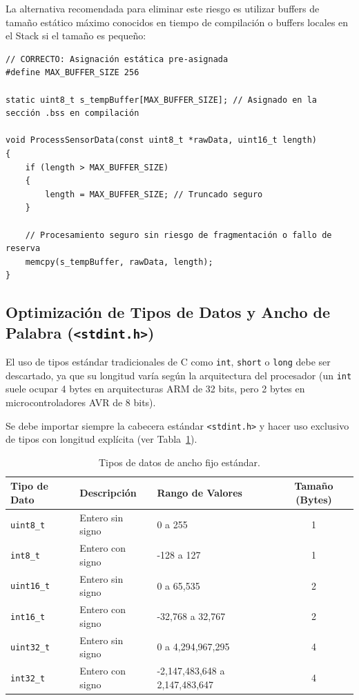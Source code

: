 \documentclass[
10pt, %
a4paper, %
oneside, %
headinclude,footinclude, %
BCOR5mm, %
]{scrartcl}
\begin{document}
La alternativa recomendada para eliminar este riesgo es utilizar buffers de tamaño estático máximo conocidos en tiempo de compilación o buffers locales en el Stack si el tamaño es pequeño:

\begin{lstlisting}[style=CMakeStyle]
// CORRECTO: Asignación estática pre-asignada
#define MAX_BUFFER_SIZE 256

static uint8_t s_tempBuffer[MAX_BUFFER_SIZE]; // Asignado en la sección .bss en compilación

void ProcessSensorData(const uint8_t *rawData, uint16_t length)
{
    if (length > MAX_BUFFER_SIZE)
    {
        length = MAX_BUFFER_SIZE; // Truncado seguro
    }
    
    // Procesamiento seguro sin riesgo de fragmentación o fallo de reserva
    memcpy(s_tempBuffer, rawData, length);
}
\end{lstlisting}

\subsection{Optimización de Tipos de Datos y Ancho de Palabra (\texorpdfstring{\texttt{<stdint.h>}}{stdint.h})}
El uso de tipos estándar tradicionales de C como \texttt{int}, \texttt{short} o \texttt{long} debe ser descartado, ya que su longitud varía según la arquitectura del procesador (un \texttt{int} suele ocupar 4 bytes en arquitecturas ARM de 32 bits, pero 2 bytes en microcontroladores AVR de 8 bits). 

Se debe importar siempre la cabecera estándar \texttt{<stdint.h>} y hacer uso exclusivo de tipos con longitud explícita (ver Tabla~\ref{tab:tipos_datos}).

\begin{table}[H]
	\centering
	\begin{tabular}{lllc}
		\toprule
		\textbf{Tipo de Dato} & \textbf{Descripción} & \textbf{Rango de Valores} & \textbf{Tamaño (Bytes)} \\
		\midrule
		\texttt{uint8\_t} & Entero sin signo & 0 a 255 & 1 \\
		\texttt{int8\_t} & Entero con signo & -128 a 127 & 1 \\
		\texttt{uint16\_t} & Entero sin signo & 0 a 65,535 & 2 \\
		\texttt{int16\_t} & Entero con signo & -32,768 a 32,767 & 2 \\
		\texttt{uint32\_t} & Entero sin signo & 0 a 4,294,967,295 & 4 \\
		\texttt{int32\_t} & Entero con signo & -2,147,483,648 a 2,147,483,647 & 4 \\
		\bottomrule
	\end{tabular}
	\caption{Tipos de datos de ancho fijo estándar.}\label{tab:tipos_datos}
\end{table}
\end{document}
